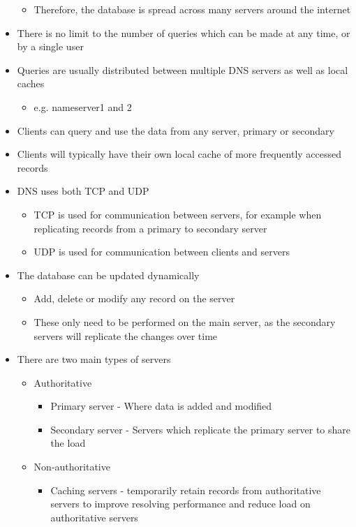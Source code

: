 \begin{itemize}
\begin{itemize}
    \item Therefore, the database is spread across many servers around the internet
  \end{itemize}
  \item There is no limit to the number of queries which can be made at any time, or by a single user
  \item Queries are usually distributed between multiple DNS servers as well as local caches
  \begin{itemize}
    \item e.g. nameserver1 and 2
  \end{itemize}
  \item Clients can query and use the data from any server, primary or secondary
  \item Clients will typically have their own local cache of more frequently accessed records
  \item DNS uses both TCP and UDP
  \begin{itemize}
    \item TCP is used for communication between servers, for example when replicating records from a primary to secondary server
    \item UDP is used for communication between clients and servers
  \end{itemize}
  \item The database can be updated dynamically
  \begin{itemize}
    \item Add, delete or modify any record on the server
    \item These only need to be performed on the main server, as the secondary servers will replicate the changes over time
  \end{itemize}
  \item There are two main types of servers
  \begin{itemize}
    \item Authoritative
    \begin{itemize}
      \item Primary server - Where data is added and modified
      \item Secondary server - Servers which replicate the primary server to share the load
    \end{itemize}
    \item Non-authoritative
    \begin{itemize}
      \item Caching servers - temporarily retain records from authoritative servers to improve resolving performance and reduce load on authoritative servers

\end{itemize}
\end{itemize}
\end{itemize}

